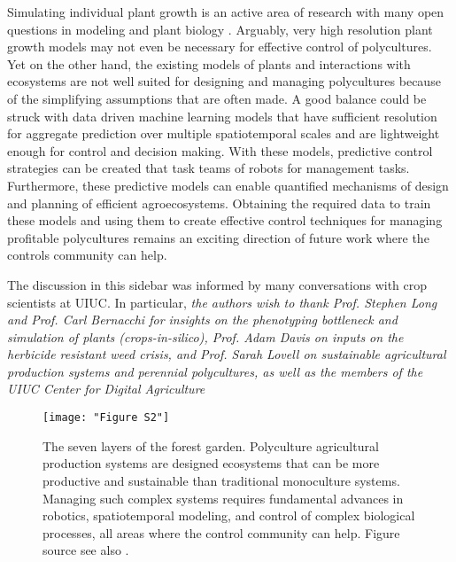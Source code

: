 Simulating individual plant growth is an active area of research with many open questions in modeling and plant biology \cite{zhu2016plants}. Arguably, very high resolution plant growth models may not even be necessary for effective control of polycultures. Yet on the other hand, the  %
 existing models of plants and interactions with ecosystems \cite{Stehfest2007a,Foley1996a, Kucharik2003a,Friedl2010a, Rodrigues2010a, Nunes2013a} are not well suited for designing and managing polycultures because of the simplifying assumptions that are often made. A good balance could be struck with data driven machine learning models that have sufficient resolution for aggregate prediction over multiple spatiotemporal scales and are lightweight enough for control and decision making. With these models, predictive control strategies can be created that task teams of robots for management tasks. Furthermore, these predictive models can enable quantified mechanisms of design and planning of efficient agroecosystems.  
 Obtaining the required data to train these models and using them to create effective control techniques for managing profitable polycultures remains an exciting direction of future work where the controls community can help.
 
 The discussion in this sidebar was informed by many conversations with  crop scientists at UIUC. In particular, 
\textit{the authors wish to thank Prof. Stephen Long and Prof. Carl Bernacchi for insights on the phenotyping bottleneck and simulation of plants (\textit{crops-in-silico}), Prof. Adam Davis on inputs on the herbicide resistant weed crisis, and Prof. Sarah Lovell on sustainable agricultural production systems and perennial polycultures, as well as the members of the UIUC Center for Digital Agriculture} 

\begin{figure}[tbh]
\texttt{[image: "Figure S2"]}
\caption{The seven layers of the forest garden. Polyculture agricultural production systems are designed ecosystems that can be more productive and sustainable than traditional monoculture systems. Managing such complex systems requires fundamental advances in robotics, spatiotemporal modeling, and control of complex biological processes, all areas where the control community can help. Figure source \cite{polyculture_fig}  see also \cite{rhodes2012feeding}.}
\label{fig:polycultures}
\end{figure}
